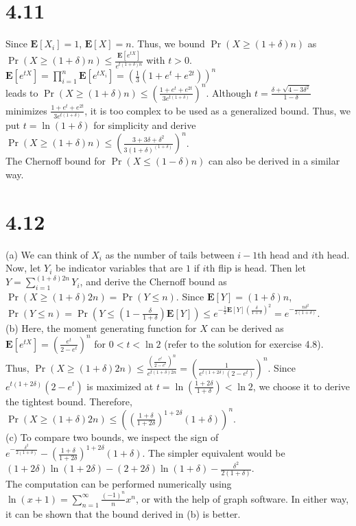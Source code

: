 \documentclass{article}
\begin{document}
\section*{4.11}
Since $\textbf{E}[X_i]=1$, $\textbf{E}[X]=n$. Thus, we bound $\Pr(X\geq (1+\delta)n)$ as\\
$\Pr(X\geq (1+\delta)n)\leq\frac{\textbf{E}[e^{tX}]}{e^{t(1+\delta)n}}$ with $t>0$. $\textbf{E}[e^{tX}]=\prod\limits_{i=1}^n\textbf{E}[e^{tX_i}]=\left(\frac{1}{3}(1+e^t+e^{2t})\right)^n$\\
leads to $\Pr(X\geq (1+\delta)n)\leq\left(\frac{1+e^t+e^{2t}}{3e^{t(1+\delta)}}\right)^n$.
Although $t=\frac{\delta+\sqrt{4-3\delta^2}}{1-\delta}$ minimizes $\frac{1+e^t+e^{2t}}{3e^{t(1+\delta)}}$, it is too complex to be used as a generalized bound.
Thus, we put $t=\ln(1+\delta)$ for simplicity and derive $\Pr(X\geq (1+\delta)n)\leq\left(\frac{3+3\delta+\delta^2}{3(1+\delta)^{(1+\delta)}}\right)^n$.\\
The Chernoff bound for $\Pr(X\leq(1-\delta)n)$ can also be derived in a similar way.
\section*{4.12}
(a) We can think of $X_i$ as the number of tails between $i-1$th head and $i$th head.
Now, let $Y_i$ be indicator variables that are $1$ if $i$th flip is head.
Then let $Y=\sum\limits_{i=1}^{(1+\delta)2n}Y_i$, and derive the Chernoff bound as $\Pr(X\geq(1+\delta)2n)=\Pr(Y\leq n)$.
Since $\textbf{E}[Y]=(1+\delta)n$, $\Pr(Y\leq n)=\Pr(Y\leq (1-\frac{\delta}{1+\delta})\textbf{E}[Y])\leq e^{-\frac{1}{2}\textbf{E}[Y](\frac{\delta}{1+\delta})^2}=e^{-\frac{n\delta^2}{2(1+\delta)}}$.\\
(b) Here, the moment generating function for $X$ can be derived as $\textbf{E}[e^{tX}]=\left(\frac{e^t}{2-e^t}\right)^n$ for $0 < t < \ln 2$ (refer to the solution for exercise 4.8).\\
Thus, $\Pr(X\geq(1+\delta)2n)\leq\frac{(\frac{e^t}{2-e^t})^n}{e^{t(1+\delta)2n}}=\left(\frac{1}{e^{t(1+2\delta)}(2-e^t)}\right)^n$.
Since $e^{t(1+2\delta)}(2-e^t)$ is maximized at $t=\ln(\frac{1+2\delta}{1+\delta}) < \ln 2$, we choose it to derive the tightest bound.
Therefore, $\Pr(X\geq(1+\delta)2n)\leq\left((\frac{1+\delta}{1+2\delta})^{1+2\delta}(1+\delta)\right)^n$.\\
(c) To compare two bounds, we inspect the sign of $e^{-\frac{\delta^2}{2(1+\delta)}}-(\frac{1+\delta}{1+2\delta})^{1+2\delta}(1+\delta)$.
The simpler equivalent would be $(1+2\delta)\ln(1+2\delta)-(2+2\delta)\ln(1+\delta)-\frac{\delta^2}{2(1+\delta)}$.\\
The computation can be performed numerically using $\ln(x+1)=\sum\limits_{n=1}^\infty\frac{(-1)^n}{n}x^n$, or with the help of graph software.
In either way, it can be shown that the bound derived in (b) is better.
\end{document}
